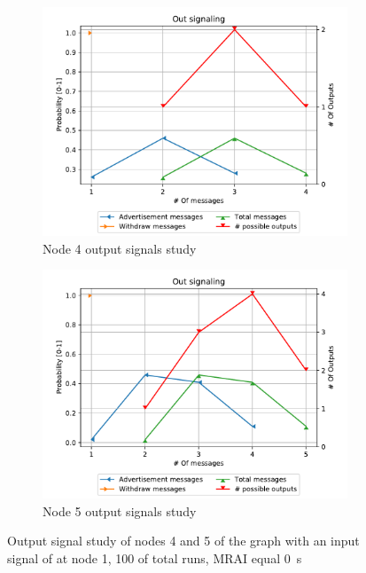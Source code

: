 \begin{figure}[h]
     \centering
     \begin{subfigure}[b]{0.49\textwidth}
         \centering
         \includegraphics[width=\textwidth]{images/signal_study/fig_4/fig_4_4_signaling_nmessage_prob.pdf}
		 \caption{Node \num{4} output signals study}
         \label{fig:signal_node4}
     \end{subfigure}
     \hfill
     \begin{subfigure}[b]{0.49\textwidth}
         \centering
         \includegraphics[width=\textwidth]{images/signal_study/fig_4/fig_4_5_signaling_nmessage_prob.pdf}
		 \caption{Node \num{5} output signals study}
         \label{fig:signal_node5}
     \end{subfigure}
		\caption{Output signal study of nodes \num{4} and \num{5} of the graph
			 with an input signal of  at node \num{1},
			\num{100} of total runs, \ac{MRAI} equal \SI{0}{\second}}
        \label{fig:signal_griffin_fig4}
\end{figure}

